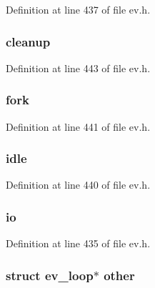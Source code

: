 \-Definition at line 437 of file ev.\-h.

\hypertarget{structev__embed_a99d7f2c1ec3aef2e906ac7b6bc63007a}{
\subsubsection[{cleanup}]{ {\bf cleanup}}}\label{structev__embed_a99d7f2c1ec3aef2e906ac7b6bc63007a}


\-Definition at line 443 of file ev.\-h.

\hypertarget{structev__embed_af379177fda35ffb759d4368f77279c9b}{
\subsubsection[{fork}]{ {\bf fork}}}\label{structev__embed_af379177fda35ffb759d4368f77279c9b}


\-Definition at line 441 of file ev.\-h.

\hypertarget{structev__embed_ae72313f3ce18355b2de897de8aa07b39}{
\subsubsection[{idle}]{ {\bf idle}}}\label{structev__embed_ae72313f3ce18355b2de897de8aa07b39}


\-Definition at line 440 of file ev.\-h.

\hypertarget{structev__embed_a0a60f96152fbb4f3d01c7ef3e4a3d856}{
\subsubsection[{io}]{ {\bf io}}}\label{structev__embed_a0a60f96152fbb4f3d01c7ef3e4a3d856}


\-Definition at line 435 of file ev.\-h.

\hypertarget{structev__embed_a3079967d5620f0904f31db1f995d74e4}{
\subsubsection[{other}]{\setlength{\rightskip}{0pt plus 5cm}struct {\bf ev\-\_\-loop}$\ast$ {\bf other}}}\label{structev__embed_a3079967d5620f0904f31db1f995d74e4}


